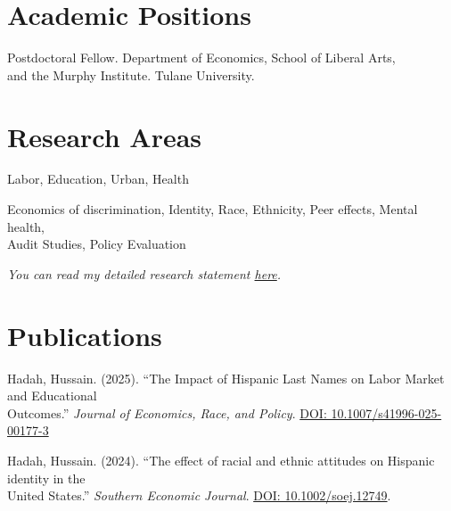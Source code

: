 \documentclass[letterpaper]{article}
\renewenvironment{itemize}{
  \begin{list}{}{
    \setlength{\leftmargin}{1.5em}
  }
}{
  \end{list}
}
\begin{document}
\section*{Academic Positions}
\vspace{2 mm}
\begin{itemize}
  \item {} Postdoctoral Fellow. Department of Economics, School of Liberal Arts, \\{\makebox[1.8cm]{\hfill}} and the Murphy Institute. Tulane University.
\end{itemize}
\vspace{2 mm}

\section*{Research Areas}
\vspace{2 mm}
\begin{itemize}
\item {} Labor, Education, Urban, Health
\item {} Economics of discrimination, Identity, Race, Ethnicity, Peer effects, Mental health, \\{\makebox[2.5cm]{\hfill}} Audit Studies, Policy Evaluation
\item \textit{You can read my detailed research statement \href{https://hhadah.github.io/statements/Hadah_Research.pdf}{here}.}
\end{itemize}
\vspace{2 mm}

\section*{Publications}
\vspace{2 mm}
\begin{itemize}
      \item Hadah, Hussain. (2025). ``The Impact of Hispanic Last Names on Labor Market and Educational \\  
    \makebox[4mm]{} Outcomes.'' \textit{Journal of Economics, Race, and Policy}. \href{https://doi.org/10.1007/s41996-025-00177-3}{DOI: 10.1007/s41996-025-00177-3}
    \item  Hadah, Hussain. (2024). ``The effect of racial and ethnic attitudes on Hispanic identity in the \\ 
    \makebox[4mm]{} United States.'' \textit{Southern Economic Journal}. \href{https://doi.org/10.1002/soej.12749}{DOI: 10.1002/soej.12749}.
\end{itemize}
\vspace{2 mm}
\end{document}
